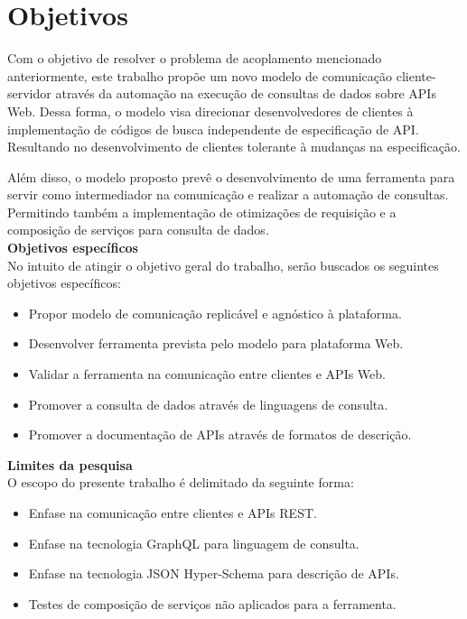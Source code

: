 \section[Objetivos]{Objetivos}

Com o objetivo de resolver o problema de acoplamento mencionado anteriormente, este trabalho propõe um novo modelo de comunicação cliente-servidor através da automação na execução de consultas de dados sobre APIs Web. Dessa forma, o modelo visa direcionar desenvolvedores de clientes à implementação de códigos de busca independente de especificação de API. Resultando no desenvolvimento de clientes tolerante à mudanças na especificação.

Além disso, o modelo proposto prevê o desenvolvimento de uma ferramenta para servir como intermediador na comunicação e realizar a automação de consultas. Permitindo também a implementação de otimizações de requisição e a composição de serviços para consulta de dados. \\

\textbf{Objetivos específicos} \\

No intuito de atingir o objetivo geral do trabalho, serão buscados os seguintes objetivos específicos:

\begin{itemize}
\item Propor modelo de comunicação replicável e agnóstico à plataforma.
\item Desenvolver ferramenta prevista pelo modelo para plataforma Web.
\item Validar a ferramenta na comunicação entre clientes e APIs Web.
\item Promover a consulta de dados através de linguagens de consulta.
\item Promover a documentação de APIs através de formatos de descrição. \\
\end{itemize}

\textbf{Limites da pesquisa} \\

O escopo do presente trabalho é delimitado da seguinte forma:

\begin{itemize}
\item Enfase na comunicação entre clientes e APIs REST.
\item Enfase na tecnologia GraphQL para linguagem de consulta.
\item Enfase na tecnologia JSON Hyper-Schema para descrição de APIs.
\item Testes de composição de serviços não aplicados para a ferramenta.
\end{itemize}
